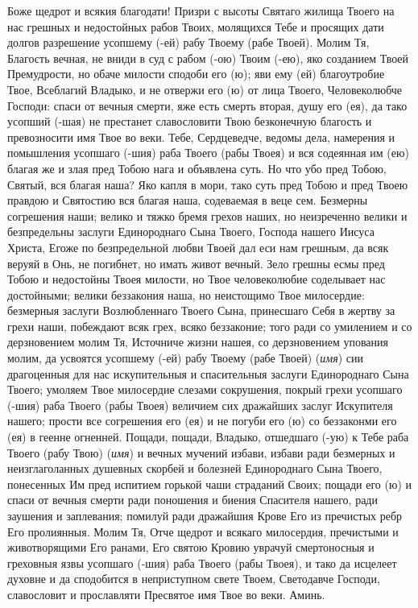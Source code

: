 \begin{mymulticols}
\end{mymulticols}

\mychapterending


\begin{mymulticols}
 


Боже щедрот и всякия благодати! Призри с высоты Святаго жилища Твоего на нас грешных и недостойных рабов Твоих, молящихся Тебе и просящих дати долгов разрешение усопшему (-ей) рабу Твоему (рабе Твоей). Молим Тя, Благость вечная, не вниди в суд с рабом (-ою) Твоим (-ею), яко созданием Твоей Премудрости, но обаче милости сподоби его (ю); яви ему (ей) благоутробие Твое, Всеблагий Владыко, и не отвержи его (ю) от лица Твоего, Человеколюбче Господи: спаси от вечныя смерти, яже есть смерть вторая, душу его (ея), да тако усопший (-шая) не престанет славословити Твою безконечную благость и превозносити имя Твое во веки. Тебе, Сердцеведче, ведомы дела, намерения и помышления усопшаго (-шия) раба Твоего (рабы Твоея) и вся содеянная им (ею) благая же и злая пред Тобою нага и объявлена суть. Но что убо пред Тобою, Святый, вся благая наша? Яко капля в мори, тако суть пред Тобою и пред Твоею правдою и Святостию вся благая наша, содеваемая в веце сем. Безмерны согрешения наши; велико и тяжко бремя грехов наших, но неизреченно велики и безпредельны заслуги Единороднаго Сына Твоего, Господа нашего Иисуса Христа, Егоже по безпредельной любви Твоей дал еси нам грешным, да всяк веруяй в Онь, не погибнет, но имать живот вечный. Зело грешны есмы пред Тобою и недостойны Твоея милости, но Твое человеколюбие соделывает нас достойными; велики беззакония наша, но неистощимо Твое милосердие: безмерныя заслуги Возлюбленнаго Твоего Сына, принесшаго Себя в жертву за грехи наши, побеждают всяк грех, всяко беззаконие; того ради со умилением и со дерзновением молим Тя, Источниче жизни нашея, со дерзновением упования молим, да усвоятся усопшему (-ей) рабу Твоему (рабе Твоей) ({\itshape имя}) сии драгоценныя для нас искупительныя и спасительныя заслуги Единороднаго Сына Твоего; умоляем Твое милосердие слезами сокрушения, покрый грехи усопшаго (-шия) раба Твоего (рабы Твоея) величием сих дражайших заслуг Искупителя нашего; прости все согрешения его (ея) и не погуби его (ю) со беззаконми его (ея) в геенне огненней. Пощади, пощади, Владыко, отшедшаго (-ую) к Тебе раба Твоего (рабу Твою) ({\itshape имя}) и вечных мучений избави, избави ради безмерных и неизглаголанных душевных скорбей и болезней Единороднаго Сына Твоего, понесенных Им пред испитием горькой чаши страданий Своих; пощади его (ю) и спаси от вечныя смерти ради поношения и биения Спасителя нашего, ради заушения и заплевания; помилуй ради дражайшия Крове Его из пречистых ребр Его пролиянныя. Молим Тя, Отче щедрот и всякаго милосердия, пречистыми и животворящими Его ранами, Его святою Кровию уврачуй смертоносныя и греховныя язвы усопшаго (-шия) раба Твоего (рабы Твоея), и тако да исцелеет духовне и да сподобится в неприступном свете Твоем, Светодавче Господи, славословит и прославляти Пресвятое имя Твое во веки. Аминь. 

\end{mymulticols}

